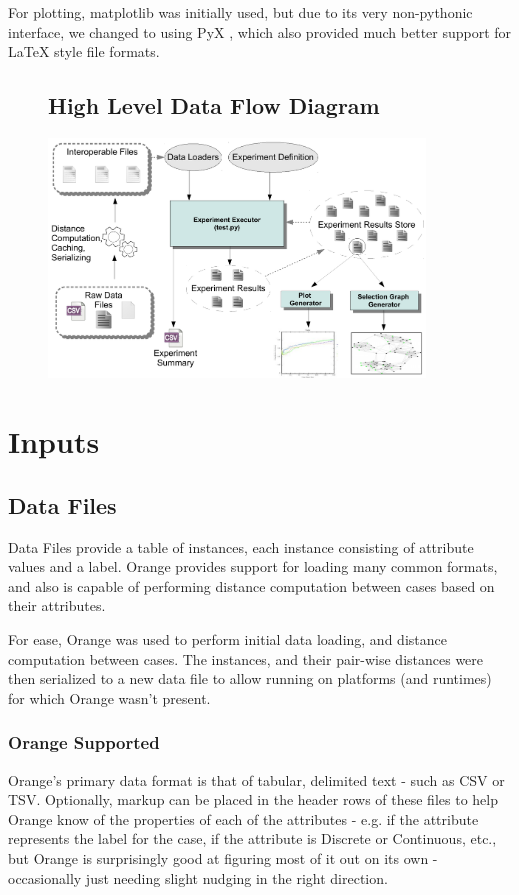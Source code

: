 \documentclass[a4paper,11pt]{report}
\begin{document}
For plotting, matplotlib \citep{prog:matplotlib} was initially used, but due to its very non-pythonic interface, we changed to using PyX \citep{prog:pyx}, which also provided much better support for \LaTeX{} style file formats.

\begin{figure}[h!]
\subsection{High Level Data Flow Diagram}
 \centering
\includegraphics[width=10cm]{./Drawn/DataFlowDiagram}
\end{figure}

\section{Inputs}
\subsection{Data Files}
Data Files provide a table of instances, each instance consisting of attribute values and a label. Orange provides support for loading many common formats, and also is capable of performing distance computation between cases based on their attributes.

For ease, Orange was used to perform initial data loading, and distance computation between cases. The instances, and their pair-wise distances were then serialized to a new data file to allow running on platforms (and runtimes) for which Orange wasn't present.

\subsubsection{Orange Supported}
Orange's primary data format is that of tabular, delimited text - such as CSV or TSV. Optionally, markup can be placed in the header rows of these files to help Orange know of the properties of each of the attributes - e.g. if the attribute represents the label for the case, if the attribute is Discrete or Continuous, etc., but Orange is surprisingly good at figuring most of it out on its own - occasionally just needing slight nudging in the right direction.
\end{document}
